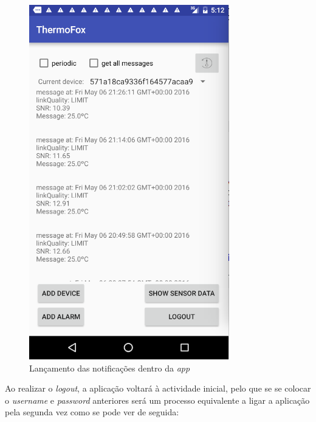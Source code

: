 \documentclass[a4paper]{article}
\begin{document}
\begin{figure}[H]
  \includegraphics[width=\linewidth]{logss.png}
  \caption{Lançamento das notificações dentro da \textit{app}}\label{fig:b}
\endminipage\hfill
\end{figure}

Ao realizar o \textit{logout}, a aplicação voltará à actividade inicial, pelo que se se colocar o \textit{username} e \textit{password} anteriores será um processo equivalente a ligar a aplicação pela segunda vez como se pode ver de seguida:
\end{document}

